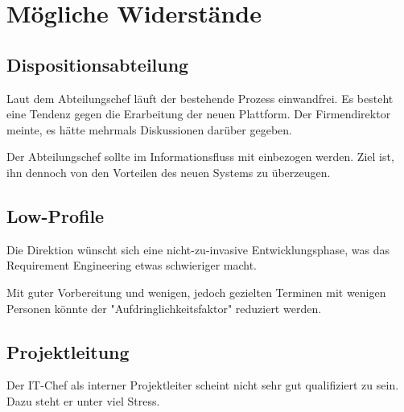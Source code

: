 \section{Mögliche Widerstände}

  \subsection{Dispositionsabteilung}
  Laut dem Abteilungschef läuft der bestehende Prozess einwandfrei. Es besteht eine Tendenz gegen die Erarbeitung der neuen Plattform.
  Der Firmendirektor meinte, es hätte mehrmals Diskussionen darüber gegeben.
  
  Der Abteilungschef sollte im Informationsfluss mit einbezogen werden. Ziel ist, ihn dennoch von den Vorteilen des neuen Systems zu überzeugen.
  
  \subsection{Low-Profile}
  Die Direktion wünscht sich eine nicht-zu-invasive Entwicklungsphase, was das Requirement Engineering etwas schwieriger macht.
  
  Mit guter Vorbereitung und wenigen, jedoch gezielten Terminen mit wenigen Personen könnte der "Aufdringlichkeitsfaktor" reduziert werden. 
  
  \subsection{Projektleitung}
  Der IT-Chef als interner Projektleiter scheint nicht sehr gut qualifiziert zu sein. Dazu steht er unter viel Stress.